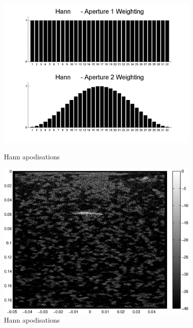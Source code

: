 \begin{figure}[p]
\centering
		\includegraphics[width=100mm]{Hanning.png}
		\caption{Hann apodisations}
		\label{fig:apod_han}

		\includegraphics[width=100mm]{SAC_Hanning.eps}
		\caption{Hann apodisations}
		\label{fig:apod_han_results}
\end{figure}

